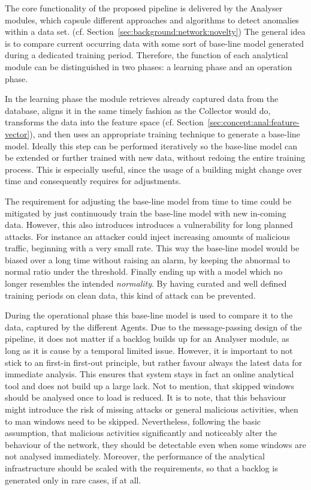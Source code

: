 The core functionality of the proposed pipeline is delivered by the Analyser modules, which capsule different approaches and algorithms to detect anomalies within a data set. (cf. Section~\ref{sec:background:network:novelty})
The general idea is to compare current occurring data with some sort of base-line model generated during a dedicated training period.
Therefore, the function of each analytical module can be distinguished in two phases: a learning phase and an operation phase.

In the learning phase the module retrieves already captured data from the database, aligns it in the same timely fashion as the Collector would do, transforms the data into the feature space (cf. Section~\ref{sec:concept:anal:feature-vector}), and then uses an appropriate training technique to generate a base-line model.
Ideally this step can be performed iteratively so the base-line model can be extended or further trained with new data, without redoing the entire training process. This is especially useful, since the usage of a building might change over time and consequently requires for adjustments.

The requirement for adjusting the base-line model from time to time could be mitigated by just continuously train the base-line model with new in-coming data.
However, this also introduces introduces a vulnerability for long planned attacks. For instance an attacker could inject increasing amounts of malicious traffic, beginning with a very small rate. This way the base-line model would be biased over a long time without raising an alarm, by keeping the abnormal to normal ratio under the threshold. Finally ending up with a model which no longer resembles the intended \emph{normality}.
By having curated and well defined training periods on clean data, this kind of attack can be prevented.

During the operational phase this base-line model is used to compare it to the data, captured by the different Agents.
Due to the message-passing design of the pipeline, it does not matter if a backlog builds up for an Analyser module, as long as it is cause by a temporal limited issue.
However, it is important to not stick to an first-in first-out principle, but rather favour always the latest data for immediate analysis. This ensures that system stays in fact an online analytical tool and does not build up a large lack. Not to mention, that skipped windows should be analysed once to load is reduced.
It is to note, that this behaviour might introduce the risk of missing attacks or general malicious activities, when to man windows need to be skipped.
Nevertheless, following the basic assumption, that malicious activities significantly and noticeably alter the behaviour of the network, they should be detectable even when some windows are not analysed immediately. Moreover, the performance of the analytical infrastructure should be scaled with the requirements, so that a backlog is generated only in rare cases, if at all.

